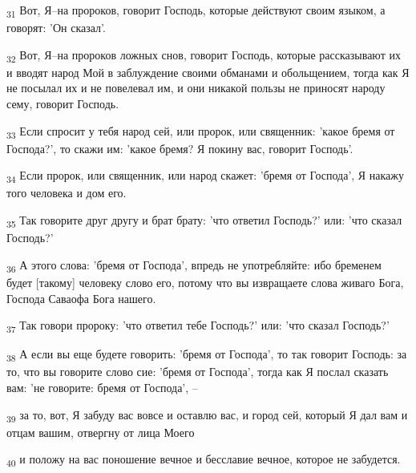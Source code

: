 \begin{tcolorbox}
\textsubscript{31} Вот, Я--на пророков, говорит Господь, которые действуют своим языком, а говорят: 'Он сказал'.
\end{tcolorbox}
\begin{tcolorbox}
\textsubscript{32} Вот, Я--на пророков ложных снов, говорит Господь, которые рассказывают их и вводят народ Мой в заблуждение своими обманами и обольщением, тогда как Я не посылал их и не повелевал им, и они никакой пользы не приносят народу сему, говорит Господь.
\end{tcolorbox}
\begin{tcolorbox}
\textsubscript{33} Если спросит у тебя народ сей, или пророк, или священник: 'какое бремя от Господа?', то скажи им: 'какое бремя? Я покину вас, говорит Господь'.
\end{tcolorbox}
\begin{tcolorbox}
\textsubscript{34} Если пророк, или священник, или народ скажет: 'бремя от Господа', Я накажу того человека и дом его.
\end{tcolorbox}
\begin{tcolorbox}
\textsubscript{35} Так говорите друг другу и брат брату: 'что ответил Господь?' или: 'что сказал Господь?'
\end{tcolorbox}
\begin{tcolorbox}
\textsubscript{36} А этого слова: 'бремя от Господа', впредь не употребляйте: ибо бременем будет [такому] человеку слово его, потому что вы извращаете слова живаго Бога, Господа Саваофа Бога нашего.
\end{tcolorbox}
\begin{tcolorbox}
\textsubscript{37} Так говори пророку: 'что ответил тебе Господь?' или: 'что сказал Господь?'
\end{tcolorbox}
\begin{tcolorbox}
\textsubscript{38} А если вы еще будете говорить: 'бремя от Господа', то так говорит Господь: за то, что вы говорите слово сие: 'бремя от Господа', тогда как Я послал сказать вам: 'не говорите: бремя от Господа', --
\end{tcolorbox}
\begin{tcolorbox}
\textsubscript{39} за то, вот, Я забуду вас вовсе и оставлю вас, и город сей, который Я дал вам и отцам вашим, отвергну от лица Моего
\end{tcolorbox}
\begin{tcolorbox}
\textsubscript{40} и положу на вас поношение вечное и бесславие вечное, которое не забудется.
\end{tcolorbox}
